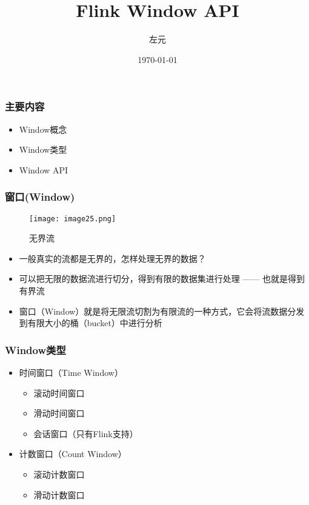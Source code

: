 \documentclass{beamer}
\title{Flink Window API}
\date{\today}
\author{左元}
\institute{尚硅谷 大数据组}
\begin{document}
  \maketitle
  \begin{frame}
    \frametitle{主要内容}

    \begin{itemize}
        \item Window概念
        \item Window类型
        \item Window API
    \end{itemize}
  
  \end{frame}

  \begin{frame}
      \frametitle{窗口(Window)}

      \begin{figure}
        \centering
        \texttt{[image: image25.png]}
        \caption{无界流}
      \end{figure}
  
      \begin{itemize}
          \item 一般真实的流都是无界的，怎样处理无界的数据？
          \item 可以把无限的数据流进行切分，得到有限的数据集进行处理 —— 也就是得到有界流
          \item 窗口（Window）就是将无限流切割为有限流的一种方式，它会将流数据分发到有限大小的桶（bucket）中进行分析
      \end{itemize}
  
  \end{frame}

  \begin{frame}
      \frametitle{Window类型}
  
      \begin{itemize}
          \item 时间窗口（Time Window）
          \begin{itemize}
              \item 滚动时间窗口
              \item 滑动时间窗口
              \item 会话窗口（只有Flink支持）
          \end{itemize}
          \item 计数窗口（Count Window）
          \begin{itemize}
              \item 滚动计数窗口
              \item 滑动计数窗口
          \end{itemize}
      \end{itemize}
  
  \end{frame}
\end{document}
